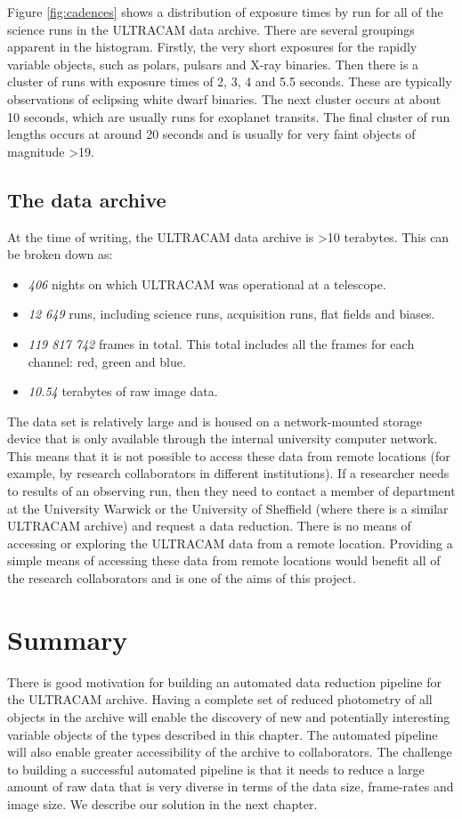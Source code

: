Figure \ref{fig:cadences} shows a distribution of exposure times by run for all of the science runs in the ULTRACAM data archive. There are several groupings apparent in the histogram. Firstly, the very short exposures for the rapidly variable objects, such as polars, pulsars and X-ray binaries. Then there is a cluster of runs with exposure times of 2, 3, 4 and 5.5 seconds. These are typically observations of eclipsing white dwarf binaries. The next cluster occurs at about 10 seconds, which are usually runs for exoplanet transits. The final cluster of run lengths occurs at around 20 seconds and is usually for very faint objects of magnitude \textgreater 19.

\subsection{The data archive}
At the time of writing, the ULTRACAM data archive is \textgreater 10 terabytes. This can be broken down as:
\begin{itemize}
	\item \emph{406} nights on which ULTRACAM was operational at a telescope.
	\item \emph{12 649} runs, including science runs, acquisition runs, flat fields and biases. 
	\item \emph{119 817 742} frames in total. This total includes all the frames for each channel: red, green and blue.
	\item \emph{10.54} terabytes of raw image data.
\end{itemize} 

The data set is relatively large and is housed on a network-mounted storage device that is only available through the internal university computer network. This means that it is not possible to access these data from remote locations (for example, by research collaborators in different institutions). If a researcher needs to results of an observing run, then they need to contact a member of department at the University Warwick or the University of Sheffield (where there is a similar ULTRACAM archive) and request a data reduction. There is no means of accessing or exploring the ULTRACAM data from a remote location. Providing a simple means of accessing these data from remote locations would benefit all of the research collaborators and is one of the aims of this project.

\section{Summary}
There is good motivation for building an automated data reduction pipeline for the ULTRACAM archive. Having a complete set of reduced photometry of all objects in the archive will enable the discovery of new and potentially interesting variable objects of the types described in this chapter. The automated pipeline will also enable greater accessibility of the archive to collaborators. The challenge to building a successful automated pipeline is that it needs to reduce a large amount of raw data that is very diverse in terms of the data size, frame-rates and image size. We describe our solution in the next chapter. 